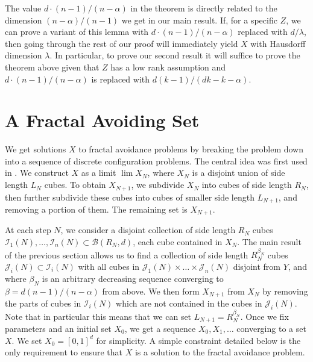 \documentclass{article}
\theoremstyle{plain}
\theoremstyle{plain}
\begin{document}
\begin{multicols}{2}
The value $d \cdot (n-1)/(n-\alpha)$ in the theorem is directly related to the dimension $(n-\alpha)/(n-1)$ we get in our main result. If, for a specific $Z$, we can prove a variant of this lemma with $d \cdot (n-1)/(n-\alpha)$ replaced with $d/\lambda$, then going through the rest of our proof will immediately yield $X$ with Hausdorff dimension $\lambda$. In particular, to prove our second result it will suffice to prove the theorem above given that $Z$ has a low rank assumption and $d \cdot (n-1)/(n-\alpha)$ is replaced with $d(k-1)/(dk - k - \alpha)$.


\section{A Fractal Avoiding Set}

We get solutions $X$ to fractal avoidance problems by breaking the problem down into a sequence of discrete configuration problems. The central idea was first used in \cite{MalabikaRob}. We construct $X$ as a limit $\lim X_N$, where $X_N$ is a disjoint union of side length $L_N$ cubes. To obtain $X_{N+1}$, we subdivide $X_N$ into cubes of side length $R_N$, then further subdivide these cubes into cubes of smaller side length $L_{N+1}$, and removing a portion of them. The remaining set is $X_{N+1}$.

At each step $N$, we consider a disjoint collection of side length $R_N$ cubes $\mathcal{I}_1(N), \dots, \mathcal{I}_n(N) \subset \mathcal{B}(R_N,d)$, each cube contained in $X_N$. The main result of the previous section allows us to find a collection of side length $R_N^{\beta_N}$ cubes $\mathcal{J}_i(N) \subset \mathcal{I}_i(N)$ with all cubes in $\mathcal{J}_1(N) \times \dots \times \mathcal{J}_n(N)$ disjoint from $Y$, and where $\beta_N$ is an arbitrary decreasing sequence converging to $\beta = d(n-1)/(n-\alpha)$ from above. We then form $X_{N+1}$ from $X_N$ by removing the parts of cubes in $\mathcal{I}_i(N)$ which are not contained in the cubes in $\mathcal{J}_i(N)$. Note that in particular this means that we can set $L_{N+1} = R_N^{\beta_N}$. Once we fix parameters and an initial set $X_0$, we get a sequence $X_0, X_1, \dots$ converging to a set $X$. We set $X_0 = [0,1]^d$ for simplicity. A simple constraint detailed below is the only requirement to ensure that $X$ is a solution to the fractal avoidance problem.


\end{multicols}
\end{document}
